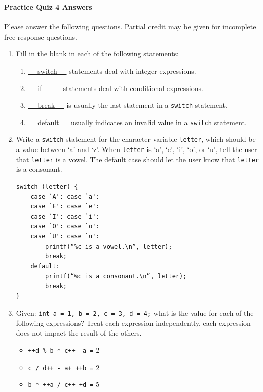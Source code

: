 \documentclass[letter,11pt]{article}
\begin{document}
\huge
\textbf{Practice Quiz 4 Answers}
\normalsize

\paragraph{}Please answer the following questions. Partial credit may be given for incomplete free response questions.

\begin{enumerate}
    \item Fill in the blank in each of the following statements:
    \begin{enumerate}
        \item \underline{~~ switch ~~} statements deal with integer expressions.
        \item \underline{~~ if ~~ ~~} statements deal with conditional expressions.
        \item \underline{~~ break ~~} is usually the last statement in a \texttt{switch} statement.
        \item \underline{~~ default ~~} usually indicates an invalid value in a \texttt{switch} statement.
    \end{enumerate}
    
    \item Write a \texttt{switch} statement for the character variable \texttt{letter}, which should be a value between `a' and `z'. When \texttt{letter} is `a', `e', `i', `o', or `u', tell the user that \texttt{letter} is a vowel. The default case should let the user know that \texttt{letter} is a consonant.
    \begin{verbatim}
switch (letter) {
    case `A': case `a':
    case `E': case `e':
    case `I': case `i':
    case `O': case `o':
    case `U': case `u':
        printf(“%c is a vowel.\n”, letter);
        break;
    default:
        printf(“%c is a consonant.\n”, letter);
        break;
}
    \end{verbatim}
    
    \item Given: \texttt{int a = 1, b = 2, c = 3, d = 4;} what is the value for each of the following expressions? Treat each expression independently, each expression does not impact the result of the others.
    \begin{itemize}
        \item \texttt{++d \% b * c++ -a =} {\color{red}2}
        \item \texttt{c / d++ - a+ ++b =} {\color{red}2}
        \item \texttt{b * ++a / c++ +d =} {\color{red}5}
    \end{itemize}
    

\end{enumerate}
\end{document}
